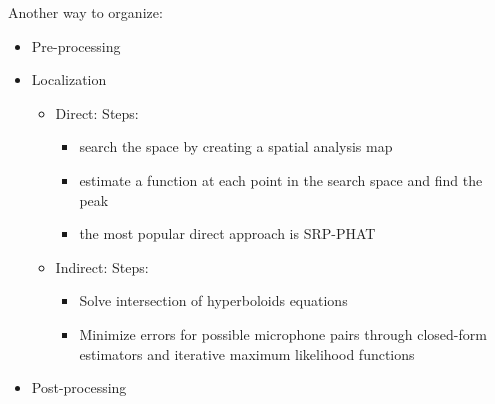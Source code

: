 Another way to organize: 
\begin{itemize}
    \item Pre-processing
    \item Localization
        \begin{itemize}
            \item Direct: Steps:
            \begin{itemize}
                \item search the space by creating a spatial analysis map
                \item estimate a function at each point in the search space and find the peak 
                \item the most popular direct approach is SRP-PHAT
            \end{itemize}
            \item Indirect: Steps:
            \begin{itemize}
                \item Solve intersection of hyperboloids equations
                \item Minimize errors for possible microphone pairs through closed-form estimators and iterative maximum likelihood functions
            \end{itemize}
             
        \end{itemize}
    \item Post-processing
    
\end{itemize}



